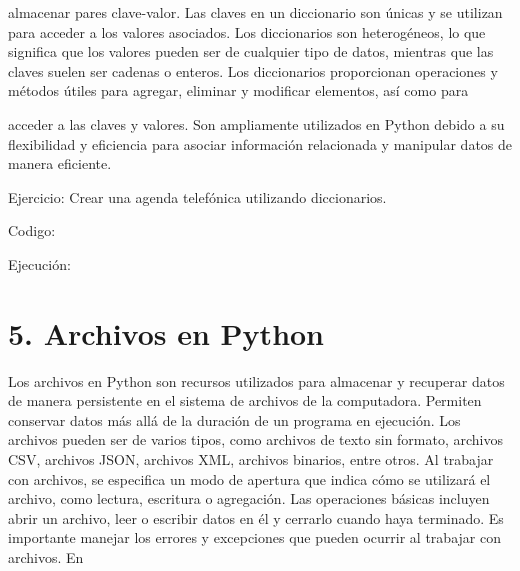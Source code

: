 \documentclass[a4paper]{article}
\begin{document}
{
almacenar pares clave-valor. Las claves en un diccionario son únicas y se utilizan para acceder a los valores asociados.
Los diccionarios son heterogéneos, lo que significa que los valores pueden ser de cualquier tipo de datos, mientras que
las claves suelen ser cadenas o enteros. Los diccionarios proporcionan operaciones y métodos útiles para agregar,
eliminar y modificar elementos, así como para}

{
acceder a las claves y valores. Son ampliamente utilizados en Python debido a su flexibilidad y eficiencia para asociar
información relacionada y manipular datos de manera eficiente.}


\bigskip

{
Ejercicio: Crear una agenda telefónica utilizando diccionarios.}

\pagestyle{Convertediii}



{
Codigo:}

{
Ejecución:}

\clearpage
\pagestyle{Convertediv}


\clearpage

\bigskip

\section{5. Archivos en Python}

\bigskip

{
Los archivos en Python son recursos utilizados para almacenar y recuperar datos de manera persistente en el sistema de
archivos de la computadora. Permiten conservar datos más allá de la duración de un programa en ejecución. Los archivos
pueden ser de varios tipos, como archivos de texto sin formato, archivos CSV, archivos JSON, archivos XML, archivos
binarios, entre otros. Al trabajar con archivos, se especifica un modo de apertura que indica cómo se utilizará el
archivo, como lectura, escritura o agregación. Las operaciones básicas incluyen abrir un archivo, leer o escribir datos
en él y cerrarlo cuando haya terminado. Es importante manejar los errores y excepciones que pueden ocurrir al trabajar
con archivos. En}
\end{document}
